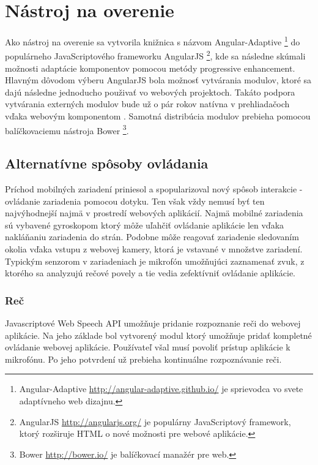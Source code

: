 \section{Nástroj na overenie} %
\label{sec:n_stroj_na_overenie}
Ako nástroj na overenie sa vytvorila knižnica s názvom Angular-Adaptive \footnote{Angular-Adaptive \url{http://angular-adaptive.github.io/} je sprievodca vo svete adaptívneho web dizajnu.} do populárneho JavaScriptového frameworku AngularJS \footnote{AngularJS \url{http://angularjs.org/} je populárny JavaScriptový framework, ktorý rozširuje HTML o nové možnosti pre webové aplikácie.}, kde sa následne skúmali možnosti adaptácie komponentov pomocou metódy progressive enhancement. Hlavným dôvodom výberu AngularJS bola možnosť vytvárania modulov, ktoré sa dajú následne jednoducho použivať vo webových projektoch. Takáto podpora vytvárania externých modulov bude už o pár rokov natívna v prehliadačoch vďaka webovým komponentom \cite{webcomponents}. Samotná distribúcia modulov prebieha pomocou balíčkovaciemu nástroja Bower \footnote{Bower \url{http://bower.io/} je balíčkovací manažér pre web.}.

\subsection{Alternatívne spôsoby ovládania} %
\label{sub:alternat_vne_sp_soby_ovl_dania}

Príchod mobilných zariadení priniesol a spopularizoval nový spôsob interakcie - ovládanie zariadenia pomocou dotyku. Ten však vždy nemusí byť ten najvýhodnejší najmä v prostredí webových aplikácií. Najmä mobilné zariadenia sú vybavené gyroskopom ktorý môže uľahčiť ovládanie aplikácie len vďaka nakláňaniu zariadenia do strán. Podobne môže reagovať zariadenie sledovaním okolia vďaka vstupu z webovej kamery, ktorá je vstavané v množstve zariadení. Typickým senzorom v zariadeniach je mikrofón umožňujúci zaznamenať zvuk, z ktorého sa analyzujú rečové povely a tie vedia zefektívniť ovládanie aplikácie.

\subsubsection{Reč} %
\label{ssub:re_}

Javascriptové Web Speech API umožňuje pridanie rozpoznanie reči do webovej aplikácie. Na jeho základe bol vytvorený modul ktorý umožňuje pridať kompletné ovládanie webovej aplikácie. Používateľ všal musí povoliť prístup aplikácie k mikrofónu. Po jeho potvrdení už prebieha kontinuálne rozpoznávanie reči.

